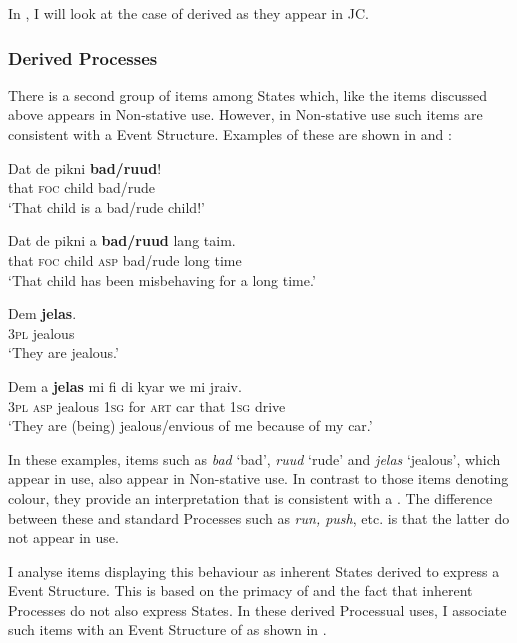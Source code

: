In , I will look at the case of derived  as they appear in JC.

\subsubsection{Derived Processes}\label{sec:5.2.3.2}

There is a second group of items among States which, like the  items discussed above appears in Non-stative use. However, in Non-stative use such items are consistent with a  Event Structure. Examples of these are shown in  and : 

\ea%
 \label{ex:5:25}
\ea 
\gll Dat de pikni \textbf{bad/ruud}!\\
that \textsc{foc} child bad/rude\\
\glt `That child is a bad\slash rude child!'

\ex 
\gll Dat de pikni a \textbf{bad/ruud} lang taim.\\
 that \textsc{foc} child \textsc{asp} bad/rude long time\\
\glt `That child has been misbehaving for a long time.'
 \z
\z

\ea%
\label{ex:5:26}
\ea
\gll Dem \textbf{jelas}.\\
 \textsc{3pl} jealous \\
\glt `They are jealous.'

\ex 
\gll Dem a \textbf{jelas} mi fi di kyar we mi jraiv.\\ 
\textsc{3pl} \textsc{asp} jealous \textsc{1sg} for \textsc{art} car that \textsc{1sg} drive\\
\glt `They are (being) jealous\slash envious of me because of my car.'
\z
\z

In these examples, items such as \textit{bad} `bad', \textit{ruud} `rude' and \textit{jelas} `jealous', which appear in  use, also appear in Non-stative use. In contrast to those items denoting colour, they provide an interpretation that is consistent with a . The difference between these and standard Processes such as \textit{run, push}, etc. is that the latter do not appear in  use. 

I analyse items displaying this behaviour as inherent States derived to express a  Event Structure. This is based on the primacy of  \citep{Grimshaw1990} and the fact that inherent Processes do not also express States. In these derived Processual uses, I associate such items with an Event Structure of  as shown in .

